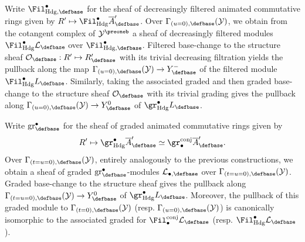 \documentclass[10pt]{amsart}
\begin{document}
\begin{construction}
Write $\Fil^\bullet_{\mathrm{Hdg},\defbase}$ for the sheaf of decreasingly filtered animated commutative rings given by $R'\mapsto \Fil^\bullet_{\mathrm{Hdg}}\overline{A}'_{\defbase}$. Over $\Gamma_{(u=0),\defbase}(\mathcal{Y})$, we obtain from the cotangent complex of $\mathcal{Y}^\preoneb$ a sheaf of decreasingly filtered modules $\Fil^\bullet_{\mathrm{Hdg}}\mathcal{L}_\defbase$ over $\Fil^\bullet_{\mathrm{Hdg},\defbase}$. Filtered base-change to the structure sheaf $\mathcal{O}_\defbase:R'\mapsto R'_{\defbase}$ with its trivial decreasing filtration yields the pullback along the map $\Gamma_{(u=0),\defbase}(\mathcal{Y})\to Y^-_{\defbase}$ of the filtered module $\Fil^\bullet_{\mathrm{Hdg}} L_\defbase$. Similarly, taking the associated graded and then graded base-change to the structure sheaf $\mathcal{O}_\defbase$ with its trivial grading gives the pullback along $\Gamma_{(u=0),\defbase}(\mathcal{Y})\to Y^0_{\defbase}$ of $\gr^\bullet_{\mathrm{Hdg}}L_\defbase$. 
\end{construction}

\begin{construction}
Write $\mathrm{gr}^\bullet_\defbase$ for the sheaf of graded animated commutative rings given by
\[
R'\mapsto \gr^\bullet_{\mathrm{Hdg}}\overline{A}'_\defbase\simeq \gr^{\mathrm{conj}}_{\bullet}\overline{A}'_\defbase.
\]
Over $\Gamma_{(t=u=0),\defbase}(\mathcal{Y})$, entirely analogously to the previous constructions, we obtain a sheaf of graded $\mathrm{gr}^\bullet_\defbase$-modules $\mathcal{L}_{\bullet,\defbase}$ over $\Gamma_{(t=u=0),\defbase}(\mathcal{Y})$. Graded base-change to the structure sheaf gives the pullback along $\Gamma_{(t=u=0),\defbase}(\mathcal{Y})\to Y^0_{\defbase}$ of $\gr^\bullet_{\mathrm{Hdg}}L_\defbase$. Moreover, the pullback of this graded module to $\Gamma_{(t=0),\defbase}(\mathcal{Y})$ (resp. $\Gamma_{(u=0),\defbase}(\mathcal{Y})$) is canonically isomorphic to the associated graded for $\Fil_\bullet^{\mathrm{conj}}\mathcal{L}_\defbase$ (resp. $\Fil_{\mathrm{Hdg}}^{\bullet} \mathcal{L}_\defbase$).
\end{construction}  
\end{document}
